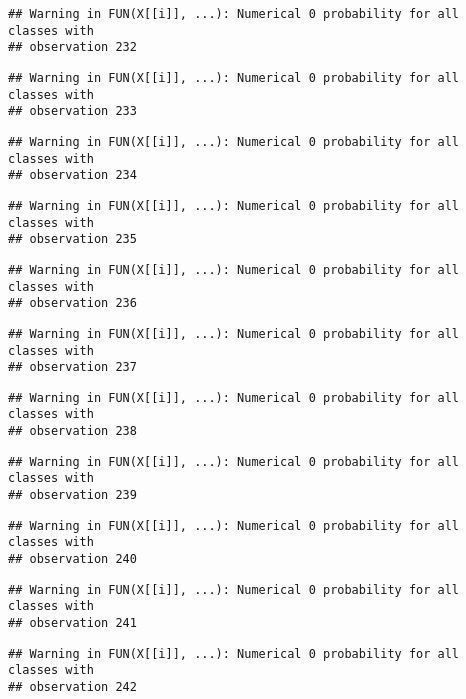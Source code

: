 \documentclass[
]{article}
\begin{document}
\begin{verbatim}
## Warning in FUN(X[[i]], ...): Numerical 0 probability for all classes with
## observation 232
\end{verbatim}

\begin{verbatim}
## Warning in FUN(X[[i]], ...): Numerical 0 probability for all classes with
## observation 233
\end{verbatim}

\begin{verbatim}
## Warning in FUN(X[[i]], ...): Numerical 0 probability for all classes with
## observation 234
\end{verbatim}

\begin{verbatim}
## Warning in FUN(X[[i]], ...): Numerical 0 probability for all classes with
## observation 235
\end{verbatim}

\begin{verbatim}
## Warning in FUN(X[[i]], ...): Numerical 0 probability for all classes with
## observation 236
\end{verbatim}

\begin{verbatim}
## Warning in FUN(X[[i]], ...): Numerical 0 probability for all classes with
## observation 237
\end{verbatim}

\begin{verbatim}
## Warning in FUN(X[[i]], ...): Numerical 0 probability for all classes with
## observation 238
\end{verbatim}

\begin{verbatim}
## Warning in FUN(X[[i]], ...): Numerical 0 probability for all classes with
## observation 239
\end{verbatim}

\begin{verbatim}
## Warning in FUN(X[[i]], ...): Numerical 0 probability for all classes with
## observation 240
\end{verbatim}

\begin{verbatim}
## Warning in FUN(X[[i]], ...): Numerical 0 probability for all classes with
## observation 241
\end{verbatim}

\begin{verbatim}
## Warning in FUN(X[[i]], ...): Numerical 0 probability for all classes with
## observation 242
\end{verbatim}
\end{document}

